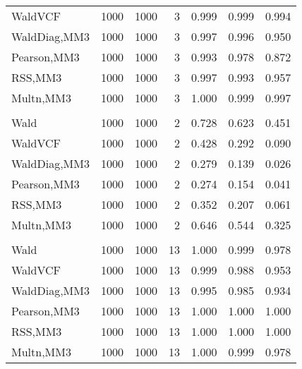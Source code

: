 \documentclass[
]{article}
\begin{document}
\begin{table}[H]
{\begin{tabular}[t]{lrrrrrr}
\hspace{1em}WaldVCF & 1000 & 1000 & 3 & 0.999 & 0.999 & 0.994\\
\hspace{1em}WaldDiag,MM3 & 1000 & 1000 & 3 & 0.997 & 0.996 & 0.950\\
\hspace{1em}Pearson,MM3 & 1000 & 1000 & 3 & 0.993 & 0.978 & 0.872\\
\hspace{1em}RSS,MM3 & 1000 & 1000 & 3 & 0.997 & 0.993 & 0.957\\
\hspace{1em}Multn,MM3 & 1000 & 1000 & 3 & 1.000 & 0.999 & 0.997\\
\addlinespace[0.3em]
\multicolumn{7}{l}{\textbf{2F 10V}}\\
\hspace{1em}Wald & 1000 & 1000 & 2 & 0.728 & 0.623 & 0.451\\
\hspace{1em}WaldVCF & 1000 & 1000 & 2 & 0.428 & 0.292 & 0.090\\
\hspace{1em}WaldDiag,MM3 & 1000 & 1000 & 2 & 0.279 & 0.139 & 0.026\\
\hspace{1em}Pearson,MM3 & 1000 & 1000 & 2 & 0.274 & 0.154 & 0.041\\
\hspace{1em}RSS,MM3 & 1000 & 1000 & 2 & 0.352 & 0.207 & 0.061\\
\hspace{1em}Multn,MM3 & 1000 & 1000 & 2 & 0.646 & 0.544 & 0.325\\
\addlinespace[0.3em]
\multicolumn{7}{l}{\textbf{3F 15V}}\\
\hspace{1em}Wald & 1000 & 1000 & 13 & 1.000 & 0.999 & 0.978\\
\hspace{1em}WaldVCF & 1000 & 1000 & 13 & 0.999 & 0.988 & 0.953\\
\hspace{1em}WaldDiag,MM3 & 1000 & 1000 & 13 & 0.995 & 0.985 & 0.934\\
\hspace{1em}Pearson,MM3 & 1000 & 1000 & 13 & 1.000 & 1.000 & 1.000\\
\hspace{1em}RSS,MM3 & 1000 & 1000 & 13 & 1.000 & 1.000 & 1.000\\
\hspace{1em}Multn,MM3 & 1000 & 1000 & 13 & 1.000 & 0.999 & 0.978\\
\bottomrule
\end{tabular}}
\endgroup{}
\end{table}
\end{document}
